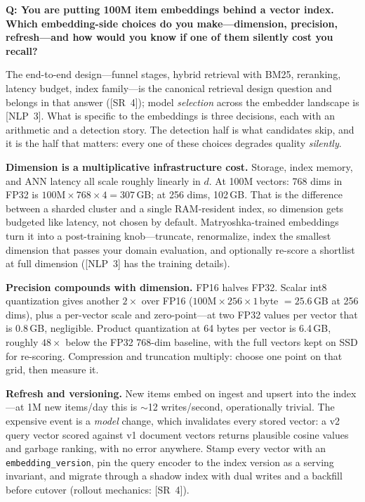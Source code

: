 \begin{interviewq}
\textbf{Q: You are putting 100M item embeddings behind a vector index. Which embedding-side choices do you make---dimension, precision, refresh---and how would you know if one of them silently cost you recall?}

 \quad {} \quad \badgefreq{\freqhigh}

\stronganswer

The end-to-end design---funnel stages, hybrid retrieval with BM25, reranking, latency budget, index family---is the canonical retrieval design question and belongs in that answer ([SR~4]); model \emph{selection} across the embedder landscape is [NLP~3]. What is specific to the embeddings is three decisions, each with an arithmetic and a detection story. The detection half is what candidates skip, and it is the half that matters: every one of these choices degrades quality \emph{silently}.

\textbf{Dimension is a multiplicative infrastructure cost.} Storage, index memory, and ANN latency all scale roughly linearly in $d$. At 100M vectors: 768 dims in FP32 is $100\text{M} \times 768 \times 4 = 307$\,GB; at 256 dims, 102\,GB. That is the difference between a sharded cluster and a single RAM-resident index, so dimension gets budgeted like latency, not chosen by default. Matryoshka-trained embeddings turn it into a post-training knob---truncate, renormalize, index the smallest dimension that passes your domain evaluation, and optionally re-score a shortlist at full dimension ([NLP~3] has the training details).

\textbf{Precision compounds with dimension.} FP16 halves FP32. Scalar int8 quantization gives another $2\times$ over FP16 ($100\text{M} \times 256 \times 1$\,byte $= 25.6$\,GB at 256 dims), plus a per-vector scale and zero-point---at two FP32 values per vector that is 0.8\,GB, negligible. Product quantization at 64 bytes per vector is 6.4\,GB, roughly $48\times$ below the FP32 768-dim baseline, with the full vectors kept on SSD for re-scoring. Compression and truncation multiply: choose one point on that grid, then measure it.

\textbf{Refresh and versioning.} New items embed on ingest and upsert into the index---at 1M new items/day this is $\sim$12 writes/second, operationally trivial. The expensive event is a \emph{model} change, which invalidates every stored vector: a v2 query vector scored against v1 document vectors returns plausible cosine values and garbage ranking, with no error anywhere. Stamp every vector with an \texttt{embedding\_version}, pin the query encoder to the index version as a serving invariant, and migrate through a shadow index with dual writes and a backfill before cutover (rollout mechanics: [SR~4]).


\end{interviewq}
